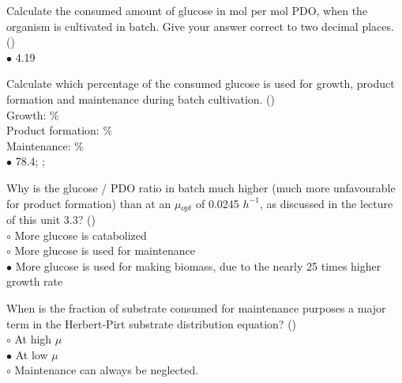 \documentclass[]{beamer}
\begin{document}
\begin{frame}[shrink] {} 
\color{blue}
Calculate the consumed amount of glucose in mol per mol PDO, when the organism is cultivated in batch. Give your answer correct to two decimal places. ({\color{green}{Q3b}})\\
\color{black}
\setlength{\parindent}{-0.4cm}
{\color{red}$\bullet$} 4.19 \\
\end{frame}


\begin{frame}[shrink] {} 
\color{blue}
Calculate which percentage of the consumed glucose is used for growth, product formation and maintenance during batch cultivation.  ({\color{green}{Q3c}})\\
\color{black}
\setlength{\parindent}{-0.4cm}
Growth: \underline{\quad }\%\\
Product formation: \underline{\quad }\%\\
Maintenance: \underline{\quad }\%\\[0.5em]
{\color{red}$\bullet$} 78.4; ;  \\
\end{frame}


\begin{frame}[shrink] {} 
\color{blue}
 Why is the glucose / PDO ratio in batch much higher (much more unfavourable for product formation) than at an $\mu$$_{opt}$ of 0.0245 $h^{-1}$, as discussed in the lecture of  this unit 3.3? ({\color{green}{Q3d}})\\
\color{black}
\setlength{\parindent}{-0.4cm}
{\color{red}$\circ$}  More glucose is catabolized \\
{\color{red}$\circ$}  More glucose is used for maintenance \\
{\color{red}$\bullet$}  More glucose is used for making biomass, due to the nearly 25 times higher growth rate \\
\end{frame}


\begin{frame}[shrink] {} 
\color{blue}
When is the fraction of substrate consumed for maintenance purposes a major term in the Herbert-Pirt substrate distribution equation? ({\color{green}{Q3e}})\\
\color{black}
\setlength{\parindent}{-0.4cm}
{\color{red}$\circ$}  At high $\mu$ \\
{\color{red}$\bullet$}  At low $\mu$ \\
{\color{red}$\circ$}  Maintenance can always be neglected. \\
\end{frame}
\end{document}
